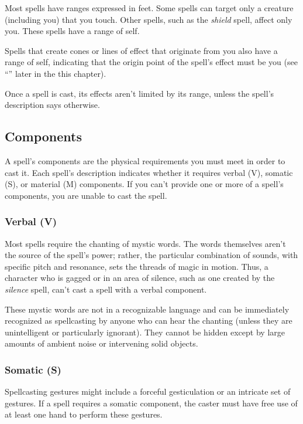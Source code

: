 Most spells have ranges expressed in feet. Some spells can target only a creature (including you) that you touch. Other spells, such as the \textit{shield} spell, affect only you. These spells have a range of self.

Spells that create cones or lines of effect that originate from you also have a range of self, indicating that the origin point of the spell's effect must be you (see “” later in the this chapter).

Once a spell is cast, its effects aren't limited by its range, unless the spell's description says otherwise.

\subsection{Components}

A spell's components are the physical requirements you must meet in order to cast it. Each spell's description indicates whether it requires verbal (V), somatic (S), or material (M) components. If you can't provide one or more of a spell's components, you are unable to cast the spell.

\subsubsection{Verbal (V)}

Most spells require the chanting of mystic words. The words themselves aren't the source of the spell's power; rather, the particular combination of sounds, with specific pitch and resonance, sets the threads of magic in motion. Thus, a character who is gagged or in an area of silence, such as one created by the \textit{silence} spell, can't cast a spell with a verbal component.

These mystic words are not in a recognizable language and can be immediately recognized as spellcasting by anyone who can hear the chanting (unless they are unintelligent or particularly ignorant). They cannot be hidden except by large amounts of ambient noise or intervening solid objects.

\subsubsection{Somatic (S)}

Spellcasting gestures might include a forceful gesticulation or an intricate set of gestures. If a spell requires a somatic component, the caster must have free use of at least one hand to perform these gestures.

